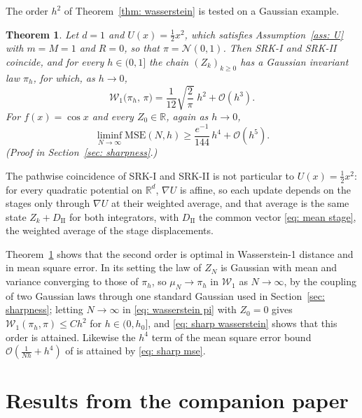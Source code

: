 \documentclass[namedate,webpdf,imanum]{ima-authoring-template}
\newcommand{\Le}{\leqslant}
\newcommand{\Ge}{\geqslant}
\theoremstyle{thmstyletwo}
\newtheorem{theorem}{Theorem}
\numberwithin{equation}{section}
\begin{document}
The order $h^2$ of Theorem~\ref{thm: wasserstein} is tested on a Gaussian example.

\begin{theorem}
\label{thm: sharpness}
    Let $d = 1$ and $U(x) = \frac12 x^2$, which satisfies Assumption~\ref{ass: U} with $m = M = 1$ and $R = 0$, so that $\pi = \mathcal N(0, 1)$. Then SRK-I and SRK-II coincide, and for every $h \in (0, 1]$ the chain $(Z_k)_{k \Ge 0}$ has a Gaussian invariant law $\pi_h$, for which, as $h \to 0$,
    \begin{equation}
        \mathcal W_1\bigl( \pi_h ,\, \pi \bigr) = \frac{1}{12} \sqrt{\frac2\pi}\; h^2 + \mathcal O(h^3) .
        \label{eq: sharp wasserstein}
    \end{equation}
    For $f(x) = \cos x$ and every $Z_0 \in \mathbb R$, again as $h \to 0$,
    \begin{equation}
        \liminf_{N \to \infty} \mathrm{MSE}(N, h) \Ge \frac{e^{-1}}{144}\, h^4 + \mathcal O(h^5) .
        \label{eq: sharp mse}
    \end{equation}
    \emph{(Proof in Section~\ref{sec: sharpness}.)}
\end{theorem}

The pathwise coincidence of SRK-I and SRK-II is not particular to $U(x) = \frac12 x^2$: for every quadratic potential on $\mathbb R^d$, $\nabla U$ is affine, so each update depends on the stages only through $\nabla U$ at their weighted average, and that average is the same state $Z_k + D_{\mathrm{II}}$ for both integrators, with $D_{\mathrm{II}}$ the common vector \eqref{eq: mean stage}, the weighted average of the stage displacements.

Theorem~\ref{thm: sharpness} shows that the second order is optimal in Wasserstein-1 distance and in mean square error. In its setting the law of $Z_N$ is Gaussian with mean and variance converging to those of $\pi_h$, so $\mu_N \to \pi_h$ in $\mathcal W_1$ as $N \to \infty$, by the coupling of two Gaussian laws through one standard Gaussian used in Section~\ref{sec: sharpness}; letting $N \to \infty$ in \eqref{eq: wasserstein pi} with $Z_0 = 0$ gives $\mathcal W_1(\pi_h, \pi) \Le C h^2$ for $h \in (0, h_0]$, and \eqref{eq: sharp wasserstein} shows that this order is attained. Likewise the $h^4$ term of the mean square error bound $\mathcal O(\frac{1}{Nh} + h^4)$ of \citet{ye2026mse} is attained by \eqref{eq: sharp mse}.

\section{Results from the companion paper}
\label{sec: recalled}
\end{document}
